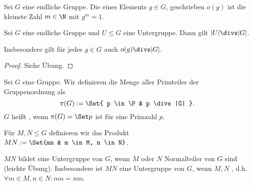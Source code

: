 \begin{df*}
	Sei $G$ eine endliche Gruppe.
	Die  eines Elements $g \in G$, geschrieben $o(g)$ ist die kleinste Zahl $m \in \N$ mit $g^m = 1$.
\end{df*}

\begin{st}[Lagrange] \label{2.2}
	Sei $G$ eine endliche Gruppe und $U \le G$ eine Untergruppe.
	Dann gilt $|U| \divs |G|$.

	Insbesondere gilt für jedes $g \in G$ auch $o(g) \divs |G|$.
	\begin{proof}
		Siehe Übung.
	\end{proof}
\end{st}

\begin{df*}
	Sei $G$ eine Gruppe.
	Wir definieren die Menge aller Primteiler der Gruppenordnung als
	\[
		\pi(G) := \Set{ p \in \P & p \divs |G| }.
	\]
	$G$ heißt , wenn $\pi(G) = \Set p$ ist für eine Primzahl $p$.

	Für $M, N \le G$ definieren wir das Produkt $MN := \Set{mn & m \in M, n \in N}$.
	\begin{note}
		$MN$ bildet eine Untergruppe von $G$, wenn $M$ oder $N$ Normalteiler von $G$ sind (leichte Übung).
		Insbesondere ist $MN$ eine Untergruppe von $G$, wenn $M, N$ , d.h. $\forall m \in M, n \in N : mn = nm$.
	\end{note}
\end{df*}


